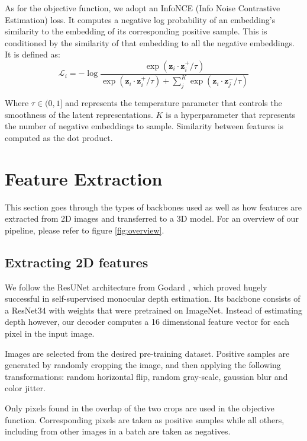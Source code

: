 \documentclass[10pt,twocolumn,letterpaper]{article}
\begin{document}
As for the objective function, we adopt an InfoNCE (Info Noise Contrastive Estimation) loss. It computes a negative log probability of an embedding's similarity to the embedding of its corresponding positive sample. This is conditioned by the similarity of that embedding to all the negative embeddings. It is defined as:
\begin{equation}
    \mathcal{L}_{i} = -\log \frac{\exp(\mathbf{z}_{i} \cdot \mathbf{z}^{+}_{i} / \tau)}{\exp(\mathbf{z}_{i} \cdot \mathbf{z}^{+}_{i} / \tau) + \sum^{K}_{j}\exp(\mathbf{z}_{i} \cdot \mathbf{z}^{-}_{j} / \tau)}
    \label{eq:contrastive_loss}
\end{equation}

Where $\tau \in (0,1]$ and represents the temperature parameter that controls the smoothness of the latent representations. $K$ is a hyperparameter that represents the number of negative embeddings to sample. Similarity between features is computed as the dot product.

\section{Feature Extraction}
\label{sec:featureExtraction}

This section goes through the types of backbones used as well as how features are extracted from 2D images and transferred to a 3D model. For an overview of our pipeline, please refer to figure \ref{fig:overview}.

\subsection{Extracting 2D features}
\label{sec:method:features2d}

We follow the ResUNet architecture from Godard \etal \cite{godard2019Digging}, which proved hugely successful in self-supervised monocular depth estimation. Its backbone consists of a ResNet34 with weights that were pretrained on ImageNet. Instead of estimating depth however, our decoder computes a 16 dimensional feature vector for each pixel in the input image.

Images are selected from the desired pre-training dataset. Positive samples are generated by randomly cropping the image, and then applying the following transformations: random horizontal flip, random gray-scale, gaussian blur and color jitter.

Only pixels found in the overlap of the two crops are used in the objective function. Corresponding pixels are taken as positive samples while all others, including from other images in a batch are taken as negatives.
\end{document}
